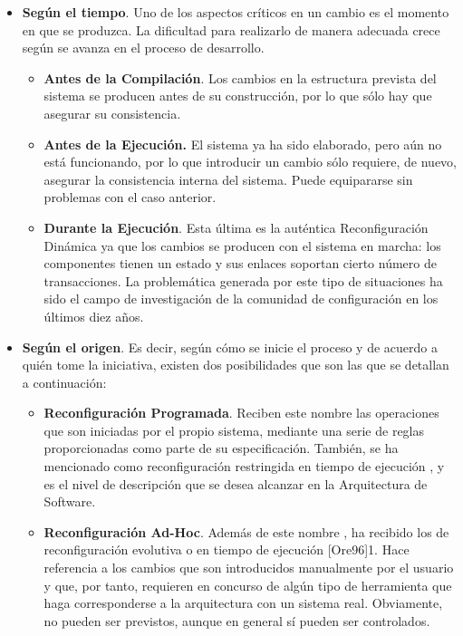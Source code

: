 \begin{itemize}
 
\item \textbf{Según el tiempo}. Uno de los aspectos críticos en un cambio es el
momento en que se produzca. La dificultad para realizarlo de manera adecuada
crece según se avanza en el proceso de desarrollo.

        \begin{itemize}
        
        \item \textbf{Antes de la Compilación}. Los cambios en la estructura prevista del
        sistema se producen antes de su construcción, por lo que sólo hay que asegurar
        su consistencia.
        
        \item \textbf{Antes de la Ejecución.} El sistema ya ha sido elaborado, pero aún no
        está funcionando, por lo que introducir un cambio sólo requiere, de nuevo,
        asegurar la consistencia interna del sistema. Puede equipararse sin problemas
        con el caso anterior.
        
        \item \textbf{Durante la Ejecución}. Esta última es la auténtica Reconfiguración
        Dinámica ya que los cambios se producen con el sistema en marcha: los componentes
        tienen un estado y sus enlaces soportan cierto número de transacciones. La
        problemática generada por este tipo de situaciones ha sido el campo de
        investigación de la comunidad de configuración en los últimos diez años.
        \end{itemize}
        
\item \textbf{Según el origen}. Es decir, según cómo se inicie el proceso y de acuerdo a quién tome la iniciativa, existen dos posibilidades que son las
que se detallan a continuación: 

    \begin{itemize}
    
     \item \textbf{Reconfiguración Programada}. Reciben este nombre \cite{EW92, MG99} las
    operaciones que son iniciadas por el propio sistema, mediante una serie de
    reglas proporcionadas como parte de su especificación. También, se ha mencionado
    como reconfiguración restringida en tiempo de ejecución \cite{Ore96}, y es el
    nivel de descripción que se desea alcanzar en la Arquitectura de Software.
    
    \item \textbf{Reconfiguración Ad-Hoc}. Además de este nombre \cite{EW9}, ha recibido los  de reconfiguración evolutiva \cite{MG99} o en tiempo de ejecución [Ore96]1. Hace  referencia a los cambios que son introducidos manualmente por el usuario y que, por tanto, requieren en concurso de algún tipo de herramienta que haga corresponderse a la arquitectura con un sistema real. Obviamente, no pueden ser previstos, aunque en general sí pueden ser controlados.
    
    \end{itemize}
    
\end{itemize}


